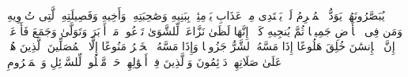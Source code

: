 یُبَصَّرُونَهُمۡۚ یَوَدُّ ٱلۡمُجۡرِمُ لَوۡ یَفۡتَدِی مِنۡ عَذَابِ یَوۡمِئِذِۭ بِبَنِیهِ%
\stopbuffer
\startbuffer[\q:70:12]
وَصَٰحِبَتِهِۦ وَأَخِیهِ%
\stopbuffer
\startbuffer[\q:70:13]
وَفَصِیلَتِهِ ٱلَّتِی تُءۡوِیهِ%
\stopbuffer
\startbuffer[\q:70:14]
وَمَن فِی ٱلۡأَرۡضِ جَمِیعࣰا ثُمَّ یُنجِیهِ%
\stopbuffer
\startbuffer[\q:70:15]
كَلَّاۤۖ إِنَّهَا لَظَىٰ%
\stopbuffer
\startbuffer[\q:70:16]
نَزَّاعَةࣰ لِّلشَّوَىٰ%
\stopbuffer
\startbuffer[\q:70:17]
تَدۡعُوا۟ مَنۡ أَدۡبَرَ وَتَوَلَّىٰ%
\stopbuffer
\startbuffer[\q:70:18]
وَجَمَعَ فَأَوۡعَىٰۤ%
\stopbuffer
\startbuffer[\q:70:19]
۞ إِنَّ ٱلۡإِنسَٰنَ خُلِقَ هَلُوعًا%
\stopbuffer
\startbuffer[\q:70:20]
إِذَا مَسَّهُ ٱلشَّرُّ جَزُوعࣰا%
\stopbuffer
\startbuffer[\q:70:21]
وَإِذَا مَسَّهُ ٱلۡخَیۡرُ مَنُوعًا%
\stopbuffer
\startbuffer[\q:70:22]
إِلَّا ٱلۡمُصَلِّینَ%
\stopbuffer
\startbuffer[\q:70:23]
ٱلَّذِینَ هُمۡ عَلَىٰ صَلَاتِهِمۡ دَاۤئِمُونَ%
\stopbuffer
\startbuffer[\q:70:24]
وَٱلَّذِینَ فِیۤ أَمۡوَٰلِهِمۡ حَقࣱّ مَّعۡلُومࣱ%
\stopbuffer
\startbuffer[\q:70:25]
لِّلسَّاۤئِلِ وَٱلۡمَحۡرُومِ%
\stopbuffer
